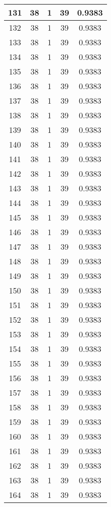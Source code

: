 \documentclass[letterpaper, 12pt]{article}
\begin{document}
\begin{longtable}{|c|c|c|c|c|}
\hline
131 & 38 & 1 & 39 & 0.9383 \\
\hline
132 & 38 & 1 & 39 & 0.9383 \\
\hline
133 & 38 & 1 & 39 & 0.9383 \\
\hline
134 & 38 & 1 & 39 & 0.9383 \\
\hline
135 & 38 & 1 & 39 & 0.9383 \\
\hline
136 & 38 & 1 & 39 & 0.9383 \\
\hline
137 & 38 & 1 & 39 & 0.9383 \\
\hline
138 & 38 & 1 & 39 & 0.9383 \\
\hline
139 & 38 & 1 & 39 & 0.9383 \\
\hline
140 & 38 & 1 & 39 & 0.9383 \\
\hline
141 & 38 & 1 & 39 & 0.9383 \\
\hline
142 & 38 & 1 & 39 & 0.9383 \\
\hline
143 & 38 & 1 & 39 & 0.9383 \\
\hline
144 & 38 & 1 & 39 & 0.9383 \\
\hline
145 & 38 & 1 & 39 & 0.9383 \\
\hline
146 & 38 & 1 & 39 & 0.9383 \\
\hline
147 & 38 & 1 & 39 & 0.9383 \\
\hline
148 & 38 & 1 & 39 & 0.9383 \\
\hline
149 & 38 & 1 & 39 & 0.9383 \\
\hline
150 & 38 & 1 & 39 & 0.9383 \\
\hline
151 & 38 & 1 & 39 & 0.9383 \\
\hline
152 & 38 & 1 & 39 & 0.9383 \\
\hline
153 & 38 & 1 & 39 & 0.9383 \\
\hline
154 & 38 & 1 & 39 & 0.9383 \\
\hline
155 & 38 & 1 & 39 & 0.9383 \\
\hline
156 & 38 & 1 & 39 & 0.9383 \\
\hline
157 & 38 & 1 & 39 & 0.9383 \\
\hline
158 & 38 & 1 & 39 & 0.9383 \\
\hline
159 & 38 & 1 & 39 & 0.9383 \\
\hline
160 & 38 & 1 & 39 & 0.9383 \\
\hline
161 & 38 & 1 & 39 & 0.9383 \\
\hline
162 & 38 & 1 & 39 & 0.9383 \\
\hline
163 & 38 & 1 & 39 & 0.9383 \\
\hline
164 & 38 & 1 & 39 & 0.9383 \\

\end{longtable}
\end{document}
